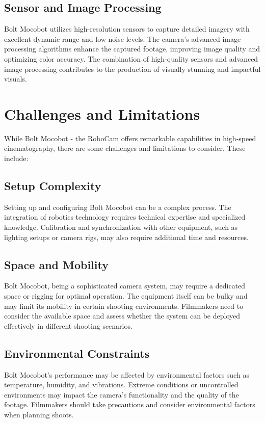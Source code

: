 \documentclass[a4paper,11pt]{report}
\begin{document}
\section{Sensor and Image Processing}
Bolt Mocobot utilizes high-resolution sensors to capture detailed imagery with excellent dynamic range and low noise levels.
The camera's advanced image processing algorithms enhance the captured footage, improving image quality and optimizing color accuracy.
The combination of high-quality sensors and advanced image processing contributes to the production of visually stunning and impactful visuals.

\chapter{Challenges and Limitations}
While Bolt Mocobot - the RoboCam offers remarkable capabilities in high-speed cinematography, there are some challenges and limitations to consider. These include:

\section{Setup Complexity}
Setting up and configuring Bolt Mocobot can be a complex process. The integration of robotics technology requires technical expertise and specialized knowledge. Calibration and synchronization with other equipment, such as lighting setups or camera rigs, may also require additional time and resources.

\section{Space and Mobility}
Bolt Mocobot, being a sophisticated camera system, may require a dedicated space or rigging for optimal operation. The equipment itself can be bulky and may limit its mobility in certain shooting environments. Filmmakers need to consider the available space and assess whether the system can be deployed effectively in different shooting scenarios.

\section{Environmental Constraints}
Bolt Mocobot's performance may be affected by environmental factors such as temperature, humidity, and vibrations. Extreme conditions or uncontrolled environments may impact the camera's functionality and the quality of the footage. Filmmakers should take precautions and consider environmental factors when planning shoots.
\end{document}
